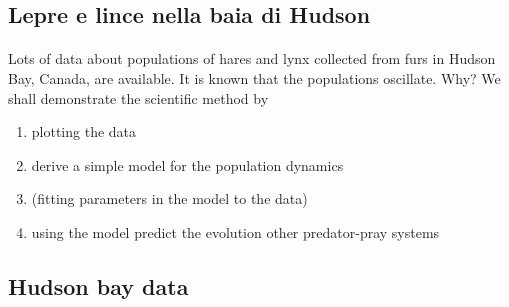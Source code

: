 \documentclass[%
oneside,                 %
final,                   %
10pt]{article}
\begin{document}
\noindent




\subsection{Lepre e lince nella baia di Hudson}


\paragraph{}
Lots of data about populations of hares and lynx collected from furs in Hudson Bay, Canada, are available. It is known that the populations oscillate. Why?
We shall demonstrate the scientific method by

\begin{enumerate}
\item plotting the data

\item derive a simple model for the population dynamics

\item (fitting parameters in the model to the data)

\item using the model predict the evolution other predator-pray systems
\end{enumerate}

\noindent



\subsection{Hudson bay data}



\paragraph{}
\end{document}
